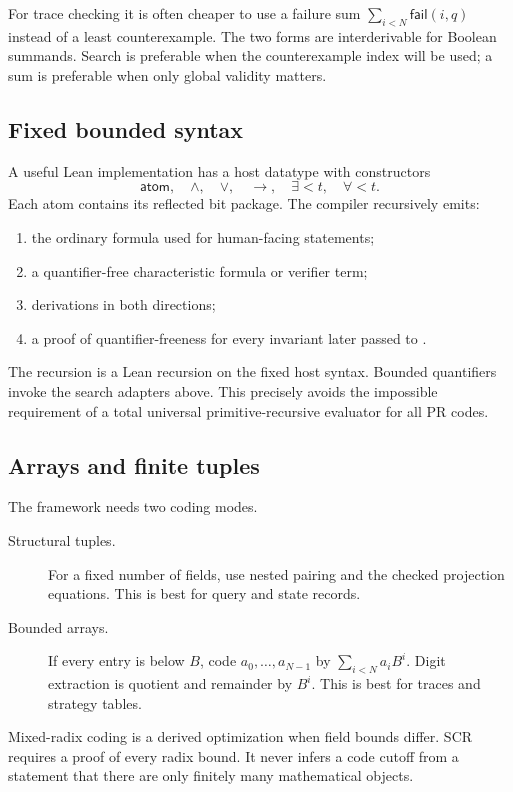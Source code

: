 For trace checking it is often cheaper to use a failure sum
\(\sum_{i<N}\mathsf{fail}(i,q)\) instead of a least counterexample.  The two
forms are interderivable for Boolean summands.  Search is preferable when the
counterexample index will be used; a sum is preferable when only global
validity matters.

\subsection{Fixed bounded syntax}

A useful Lean implementation has a host datatype with constructors
\[
  \mathsf{atom},\quad \wedge,\quad\vee,\quad\to,\quad
  \exists{<}t,\quad\forall{<}t.
\]
Each atom contains its reflected bit package.  The compiler recursively emits:
\begin{enumerate}[label=(\alph*)]
\item the ordinary formula used for human-facing statements;
\item a quantifier-free characteristic formula or verifier term;
\item derivations in both directions;
\item a proof of quantifier-freeness for every invariant later passed to
      .
\end{enumerate}
The recursion is a Lean recursion on the fixed host syntax.  Bounded
quantifiers invoke the search adapters above.  This precisely avoids the
impossible requirement of a total universal primitive-recursive evaluator for
all PR codes.

\subsection{Arrays and finite tuples}

The framework needs two coding modes.

\begin{description}
\item[Structural tuples.]  For a fixed number of fields, use nested pairing and
the checked projection equations.  This is best for query and state records.
\item[Bounded arrays.]  If every entry is below \(B\), code
\(a_0,\ldots,a_{N-1}\) by \(\sum_{i<N}a_i B^i\).  Digit extraction is quotient
and remainder by \(B^i\).  This is best for traces and strategy tables.
\end{description}

Mixed-radix coding is a derived optimization when field bounds differ.  SCR
requires a proof of every radix bound.  It never infers a code cutoff from a
statement that there are only finitely many mathematical objects.

